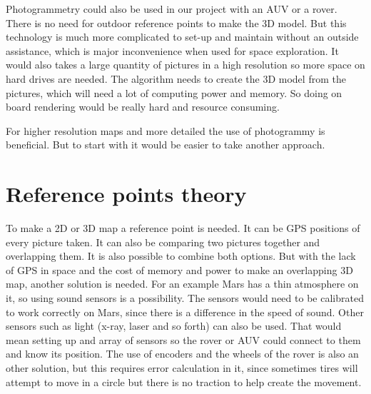 Photogrammetry could also be used in our project with an AUV or a rover. There is no need for outdoor reference points to make the 3D model. But this technology is much more complicated to set-up and maintain without an outside assistance, which is major inconvenience when used for space exploration. It would also takes a large quantity of pictures in a high resolution so more space on hard drives are needed. The algorithm needs to create the 3D model from the pictures, which will need a lot of computing power and memory. So doing on board rendering would be really hard and resource consuming.

For higher resolution maps and more detailed the use of photogrammy is beneficial. But to start with it would be easier to take another approach.

\section{Reference points theory}

To make a 2D or 3D map a reference point is needed. It can be GPS positions of every picture taken. It can also be comparing two pictures together and overlapping them. It is also possible to combine both options. But with the lack of GPS in space and the cost of memory and power to make an overlapping 3D map, another solution is needed. For an example Mars has a thin atmosphere on it, so using sound sensors is a possibility. The sensors would need to be calibrated to work correctly on Mars, since there is a difference in the speed of sound. Other sensors such as light (x-ray, laser and so forth) can also be used. That would mean setting up and array of sensors so the rover or AUV could connect to them and know its position. The use of encoders and the wheels of the rover is also an other solution, but this requires error calculation in it, since sometimes tires will attempt to move in a circle but there is no traction to help create the movement.\cite{reference} 










